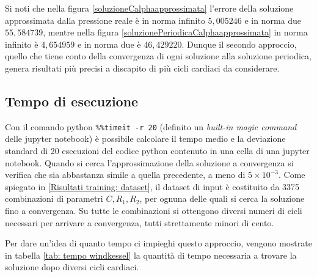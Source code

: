 Si noti che nella figura \ref{soluzioneCalphaapprossimata} l'errore della soluzione approssimata dalla pressione reale è in norma infinito $5,005246$ e in norma due $55,584739$, mentre nella figura \ref{soluzionePeriodicaCalphaapprossimata} in norma infinito è $4,654959$ e in norma due è $46,429220$. Dunque il secondo approccio, quello che tiene conto della convergenza di ogni soluzione alla soluzione periodica, genera risultati più precisi a discapito di più cicli cardiaci da considerare.


\subsection{Tempo di esecuzione} \label{Windkessel: tempo esecuzione}
Con il comando python \verb+%%timeit -r 20+ (definito un \textit{built-in magic command} delle jupyter notebook) è possibile calcolare il tempo medio e la deviazione standard di 20 esecuzioni del codice python contenuto in una cella di una jupyter notebook. Quando si cerca l'approssimazione della soluzione a convergenza si verifica che sia abbastanza simile a quella precedente, a meno di $5\times 10^{-3}$. Come spiegato in \ref{Risultati training: dataset}, il dataset di input è costituito da 3375 combinazioni di parametri $C, R_1, R_2$, per ognuna delle quali si cerca la soluzione fino a convergenza. Su tutte le combinazioni si ottengono diversi numeri di cicli necessari per arrivare a convergenza, tutti strettamente minori di cento. 

\newpage

Per dare un'idea di quanto tempo ci impieghi questo approccio, vengono mostrate in tabella \ref{tab: tempo windkessel} la quantità di tempo necessaria a trovare la soluzione dopo diversi cicli cardiaci.

\vspace{1cm}







